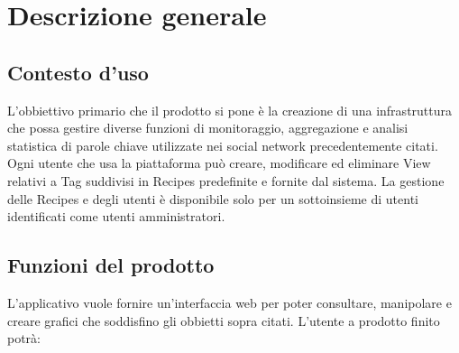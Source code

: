 %


\section{Descrizione generale}

\subsection{Contesto d'uso}
L'obbiettivo primario che il prodotto si pone è la creazione di una infrastruttura che
possa gestire diverse funzioni di monitoraggio, aggregazione e analisi statistica di parole chiave utilizzate nei social network precedentemente citati. Ogni utente che usa la piattaforma può creare, modificare ed eliminare View relativi a Tag suddivisi in Recipes predefinite e fornite dal sistema.
La gestione delle Recipes e degli utenti è disponibile solo per un sottoinsieme di utenti identificati come utenti amministratori.

\subsection{Funzioni del prodotto}
L'applicativo vuole fornire un'interfaccia web per poter consultare, manipolare e creare grafici che soddisfino gli obbietti sopra citati. L'utente a prodotto finito potrà:

